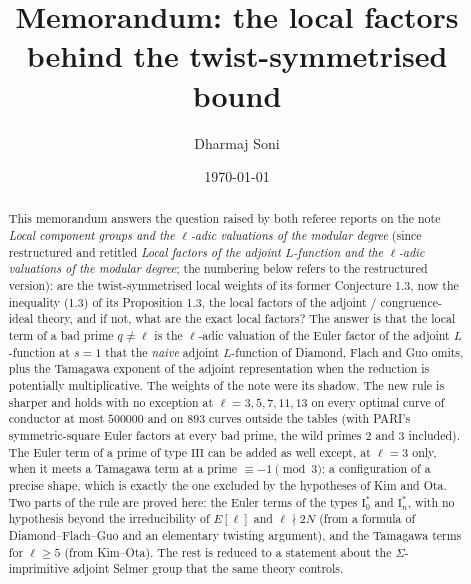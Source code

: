 \documentclass[11pt]{amsart}
\title{Memorandum: the local factors behind the twist-symmetrised bound}
\author{Dharmaj Soni}
\date{\today}
\theoremstyle{definition}
\begin{document}
\begin{abstract}
This memorandum answers the question raised by both referee reports on the note \emph{Local component groups and the $\ell$-adic valuations of the modular degree} (since restructured and retitled \emph{Local factors of the adjoint $L$-function and the $\ell$-adic valuations of the modular degree}; the numbering below refers to the restructured version): are the twist-symmetrised local weights of its former Conjecture 1.3, now the inequality (1.3) of its Proposition 1.3, the local factors of the adjoint / congruence-ideal theory, and if not, what are the exact local factors? The answer is that the local term of a bad prime $q\ne\ell$ is the $\ell$-adic valuation of the Euler factor of the adjoint $L$-function at $s=1$ that the \emph{naive} adjoint $L$-function of Diamond, Flach and Guo omits, plus the Tamagawa exponent of the adjoint representation when the reduction is potentially multiplicative. The weights of the note were its shadow. The new rule is sharper and holds with no exception at $\ell=3,5,7,11,13$ on every optimal curve of conductor at most $500000$ and on $893$ curves outside the tables (with PARI's symmetric-square Euler factors at every bad prime, the wild primes $2$ and $3$ included). The Euler term of a prime of type $\mathrm{III}$ can be added as well except, at $\ell=3$ only, when it meets a Tamagawa term at a prime $\equiv-1\pmod3$: a configuration of a precise shape, which is exactly the one excluded by the hypotheses of Kim and Ota. Two parts of the rule are proved here: the Euler terms of the types $\mathrm{I}_0^*$ and $\mathrm{I}_n^*$, with no hypothesis beyond the irreducibility of $E[\ell]$ and $\ell\nmid 2N$ (from a formula of Diamond--Flach--Guo and an elementary twisting argument), and the Tamagawa terms for $\ell\ge5$ (from Kim--Ota). The rest is reduced to a statement about the $\Sigma$-imprimitive adjoint Selmer group that the same theory controls.
\end{abstract}
\maketitle
\end{document}
